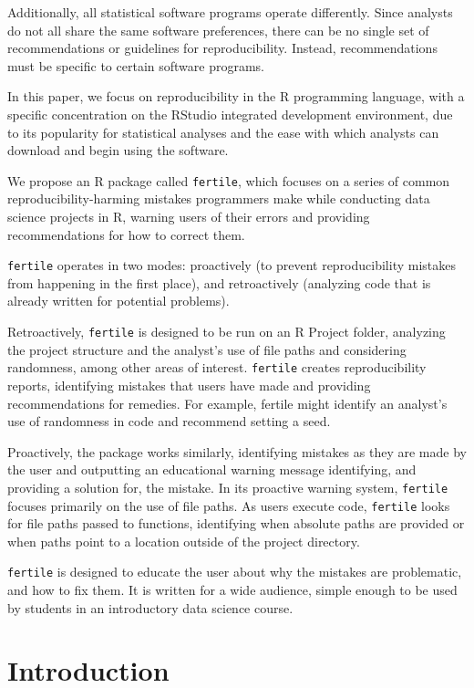 \documentclass[12pt]{article}
\begin{document}
Additionally, all statistical software programs operate differently.
Since analysts do not all share the same software preferences, there can
be no single set of recommendations or guidelines for reproducibility.
Instead, recommendations must be specific to certain software programs.

In this paper, we focus on reproducibility in the R programming
language, with a specific concentration on the RStudio integrated
development environment, due to its popularity for statistical analyses
and the ease with which analysts can download and begin using the
software.

We propose an R package called \texttt{fertile}, which focuses on a
series of common reproducibility-harming mistakes programmers make while
conducting data science projects in R, warning users of their errors and
providing recommendations for how to correct them.

\texttt{fertile} operates in two modes: proactively (to prevent
reproducibility mistakes from happening in the first place), and
retroactively (analyzing code that is already written for potential
problems).

Retroactively, \texttt{fertile} is designed to be run on an R Project
folder, analyzing the project structure and the analyst's use of file
paths and considering randomness, among other areas of interest.
\texttt{fertile} creates reproducibility reports, identifying mistakes
that users have made and providing recommendations for remedies. For
example, fertile might identify an analyst's use of randomness in code
and recommend setting a seed.

Proactively, the package works similarly, identifying mistakes as they
are made by the user and outputting an educational warning message
identifying, and providing a solution for, the mistake. In its proactive
warning system, \texttt{fertile} focuses primarily on the use of file
paths. As users execute code, \texttt{fertile} looks for file paths
passed to functions, identifying when absolute paths are provided or
when paths point to a location outside of the project directory.

\texttt{fertile} is designed to educate the user about why the mistakes
are problematic, and how to fix them. It is written for a wide audience,
simple enough to be used by students in an introductory data science
course.

\section{Introduction}\label{introduction}
\end{document}
